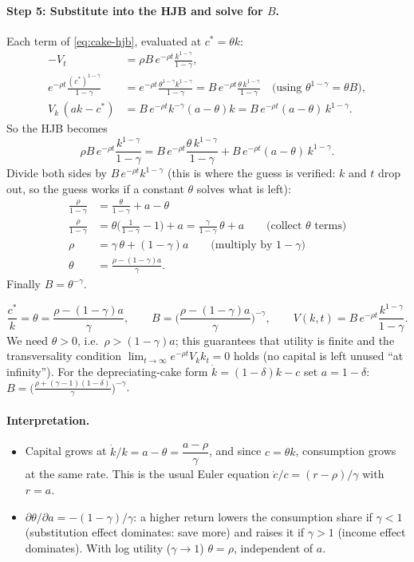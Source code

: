 \paragraph{Step 5: Substitute into the HJB and solve for $B$.}
Each term of \eqref{eq:cake-hjb}, evaluated at $c^*=\theta k$:
\begin{align*}
-V_t&=\rho B\,e^{-\rho t}\frac{k^{1-\gamma}}{1-\gamma},\\
e^{-\rho t}\frac{(c^*)^{1-\gamma}}{1-\gamma}&=e^{-\rho t}\frac{\theta^{1-\gamma}k^{1-\gamma}}{1-\gamma}=B\,e^{-\rho t}\frac{\theta\,k^{1-\gamma}}{1-\gamma}\quad\text{(using $\theta^{1-\gamma}=\theta B$)},\\
V_k\,(ak-c^*)&=B\,e^{-\rho t}k^{-\gamma}(a-\theta)k=B\,e^{-\rho t}(a-\theta)\,k^{1-\gamma}.
\end{align*}
So the HJB becomes
\[
\rho B\,e^{-\rho t}\frac{k^{1-\gamma}}{1-\gamma}=B\,e^{-\rho t}\frac{\theta\,k^{1-\gamma}}{1-\gamma}+B\,e^{-\rho t}(a-\theta)\,k^{1-\gamma}.
\]
Divide both sides by $B\,e^{-\rho t}k^{1-\gamma}$ (this is where the guess is verified: $k$ and $t$ drop out, so the guess works if a constant $\theta$ solves what is left):
\begin{align*}
\frac{\rho}{1-\gamma}&=\frac{\theta}{1-\gamma}+a-\theta\\
\frac{\rho}{1-\gamma}&=\theta\Big(\frac{1}{1-\gamma}-1\Big)+a=\frac{\gamma}{1-\gamma}\,\theta+a\qquad\text{(collect $\theta$ terms)}\\
\rho&=\gamma\,\theta+(1-\gamma)a\qquad\text{(multiply by $1-\gamma$)}\\
\theta&=\frac{\rho-(1-\gamma)a}{\gamma}.
\end{align*}
Finally $B=\theta^{-\gamma}$.

\begin{keybox}[title={Solution of the deterministic CRRA problem}]
\[
\frac{c^*}{k}=\theta=\frac{\rho-(1-\gamma)a}{\gamma},\qquad B=\Big(\frac{\rho-(1-\gamma)a}{\gamma}\Big)^{-\gamma},\qquad V(k,t)=B\,e^{-\rho t}\frac{k^{1-\gamma}}{1-\gamma}.
\]
We need $\theta>0$, i.e.\ $\rho>(1-\gamma)a$; this guarantees that utility is finite and the transversality condition $\lim_{t\to\infty}e^{-\rho t}V_k k_t=0$ holds (no capital is left unused ``at infinity'').
For the depreciating-cake form $\dot k=(1-\delta)k-c$ set $a=1-\delta$: $B=\big(\frac{\rho+(\gamma-1)(1-\delta)}{\gamma}\big)^{-\gamma}$.
\end{keybox}

\paragraph{Interpretation.}
\begin{itemize}
\item Capital grows at $\dot k/k=a-\theta=\dfrac{a-\rho}{\gamma}$, and since $c=\theta k$, consumption grows at the same rate. This is the usual Euler equation $\dot c/c=(r-\rho)/\gamma$ with $r=a$.
\item $\partial\theta/\partial a=-(1-\gamma)/\gamma$: a higher return lowers the consumption share if $\gamma<1$ (substitution effect dominates: save more) and raises it if $\gamma>1$ (income effect dominates). With log utility ($\gamma\to1$) $\theta=\rho$, independent of $a$.
\end{itemize}

